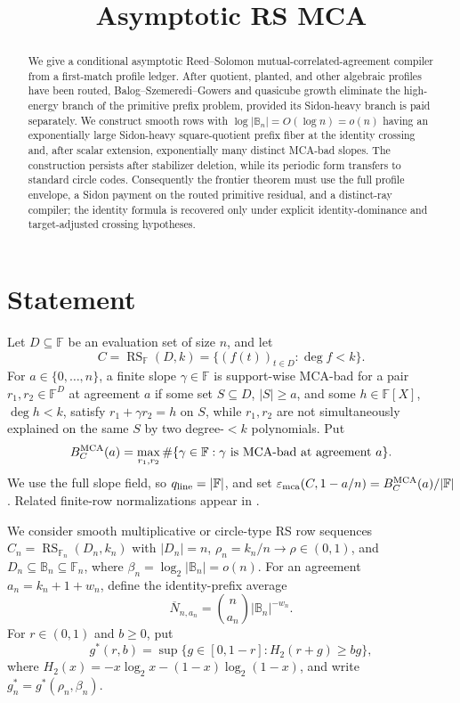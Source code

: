 \documentclass[11pt,a4paper]{amsart}
\title{Asymptotic RS MCA}
\date{}
\numberwithin{equation}{section}
\theoremstyle{remark}
\DeclareMathOperator{\RS}{RS}
\newcommand{\F}{\mathbb F}
\newcommand{\B}{\mathbb B}
\newcommand{\barN}{\overline N}
\newcommand{\eps}{\varepsilon}
\begin{document}
\begin{abstract}
We give a conditional asymptotic Reed--Solomon mutual-correlated-agreement compiler from a first-match profile ledger.  After quotient, planted, and other algebraic profiles have been routed, Balog--Szemeredi--Gowers and quasicube growth eliminate the high-energy branch of the primitive prefix problem, provided its Sidon-heavy branch is paid separately.  We construct smooth rows with \(\log|\B_n|=O(\log n)=o(n)\) having an exponentially large Sidon-heavy square-quotient prefix fiber at the identity crossing and, after scalar extension, exponentially many distinct MCA-bad slopes.  The construction persists after stabilizer deletion, while its periodic form transfers to standard circle codes.  Consequently the frontier theorem must use the full profile envelope, a Sidon payment on the routed primitive residual, and a distinct-ray compiler; the identity formula is recovered only under explicit identity-dominance and target-adjusted crossing hypotheses.
\end{abstract}

\maketitle

\section{Statement}

Let \(D\subseteq \F\) be an evaluation set of size \(n\), and let
\[
        C=\RS_{\F}(D,k)=\{(f(t))_{t\in D}:\deg f<k\}.
\]
For \(a\in\{0,\ldots,n\}\), a finite slope \(\gamma\in\F\) is support-wise MCA-bad for a pair \(r_1,r_2\in\F^D\) at agreement \(a\) if some set \(S\subseteq D\), \(|S|\ge a\), and some \(h\in\F[X]\), \(\deg h<k\), satisfy \(r_1+\gamma r_2=h\) on \(S\), while \(r_1,r_2\) are not simultaneously explained on the same \(S\) by two degree-\(<k\) polynomials.  Put
\[
        B_C^{\rm MCA}(a)
        =\max_{r_1,r_2}\#\{\gamma\in\F:\gamma\text{ is MCA-bad at agreement }a\}.
\]
We use the full slope field, so \(q_{\rm line}=|\F|\), and set
\(\eps_{\rm mca}(C,1-a/n)=B_C^{\rm MCA}(a)/|\F|\).  Related finite-row
normalizations appear in \cite{Cho26CapV13,Cho26Grande}.

We consider smooth multiplicative or circle-type RS row sequences
\(C_n=\RS_{\F_n}(D_n,k_n)\) with \(|D_n|=n\),
\(\rho_n=k_n/n\to\rho\in(0,1)\), and
\(D_n\subseteq\B_n\subseteq\F_n\), where
\(\beta_n=\log_2|\B_n|=o(n)\).  For an agreement
\(a_n=k_n+1+w_n\), define the identity-prefix average
\[
        \barN_{n,a_n}=\binom n{a_n}|\B_n|^{-w_n}.
\]
For \(r\in(0,1)\) and \(b\ge0\), put
\[
        g^*(r,b)=\sup\{g\in[0,1-r]:H_2(r+g)\ge bg\},
\]
where \(H_2(x)=-x\log_2x-(1-x)\log_2(1-x)\), and write
\(g_n^*=g^*(\rho_n,\beta_n)\).
\end{document}
